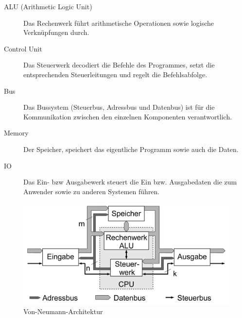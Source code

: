                     \begin{description}
                        \item[ALU (Arithmetic Logic Unit)] Das Rechenwerk führt arithmetische Operationen sowie logische Verknüpfungen durch. 
                        \item[Control Unit] Das Steuerwerk decodiert die Befehle des Programmes,
                        setzt die entsprechenden Steuerleitungen und regelt die Befehlsabfolge.
                        \item[Bus] Das Bussystem (Steuerbus, Adressbus und Datenbus) ist für die Kommunikation zwischen den einzelnen
                        Komponenten verantwortlich.
                        \item[Memory] Der Speicher, speichert das eigentliche Programm sowie auch die Daten.
                        \item[IO] Das Ein- bzw Ausgabewerk steuert die Ein bzw. Ausgabedaten die zum Anwender sowie zu anderen Systemen führen.
                    \end{description}
                    \begin{figure}[H]
                        \centering
                        \includegraphics[scale=0.2]{img/vonneumann.png}
                        \caption[Von-Neumann-Architektur]{Von-Neumann-Architektur \cite{von-neumann-architektur}}
                        \label{fig:vonneumann}
                    \end{figure}

